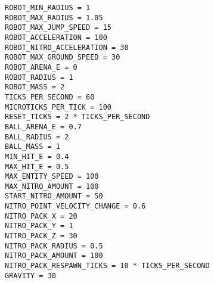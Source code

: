 \begin{verbatim}
ROBOT_MIN_RADIUS = 1
ROBOT_MAX_RADIUS = 1.05
ROBOT_MAX_JUMP_SPEED = 15
ROBOT_ACCELERATION = 100
ROBOT_NITRO_ACCELERATION = 30
ROBOT_MAX_GROUND_SPEED = 30
ROBOT_ARENA_E = 0
ROBOT_RADIUS = 1
ROBOT_MASS = 2
TICKS_PER_SECOND = 60
MICROTICKS_PER_TICK = 100
RESET_TICKS = 2 * TICKS_PER_SECOND
BALL_ARENA_E = 0.7
BALL_RADIUS = 2
BALL_MASS = 1
MIN_HIT_E = 0.4
MAX_HIT_E = 0.5
MAX_ENTITY_SPEED = 100
MAX_NITRO_AMOUNT = 100
START_NITRO_AMOUNT = 50
NITRO_POINT_VELOCITY_CHANGE = 0.6
NITRO_PACK_X = 20
NITRO_PACK_Y = 1
NITRO_PACK_Z = 30
NITRO_PACK_RADIUS = 0.5
NITRO_PACK_AMOUNT = 100
NITRO_PACK_RESPAWN_TICKS = 10 * TICKS_PER_SECOND
GRAVITY = 30
\end{verbatim}
